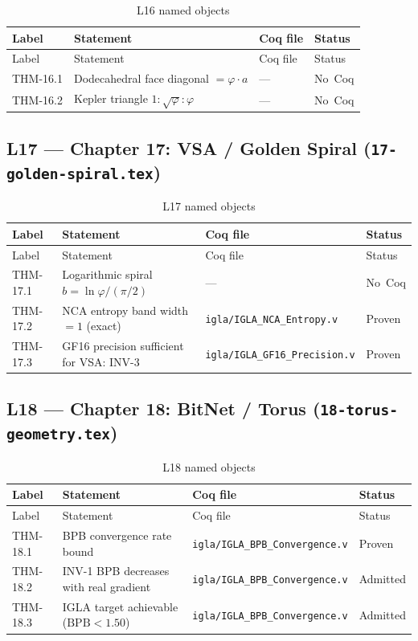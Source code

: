 \begin{longtable}{lp{6cm}ll}
\toprule
Label & Statement & Coq file & Status \\
\midrule
\endfirsthead
\toprule
Label & Statement & Coq file & Status \\
\midrule
\endhead
\bottomrule
\endfoot
\bottomrule
\caption{L16 named objects}
\endlastfoot
THM-16.1 & Dodecahedral face diagonal $= \varphi \cdot a$ & --- & No~Coq \\
THM-16.2 & Kepler triangle $1:\sqrt{\varphi}:\varphi$ & --- & No~Coq \\
\end{longtable}

\subsection{L17 — Chapter 17: VSA / Golden Spiral
  (\texttt{17-golden-spiral.tex})}
\label{sec:A-L17}

\begin{longtable}{lp{6cm}ll}
\toprule
Label & Statement & Coq file & Status \\
\midrule
\endfirsthead
\toprule
Label & Statement & Coq file & Status \\
\midrule
\endhead
\bottomrule
\endfoot
\bottomrule
\caption{L17 named objects}
\endlastfoot
THM-17.1 & Logarithmic spiral $b = \ln\varphi/(\pi/2)$ & --- & No~Coq \\
THM-17.2 & NCA entropy band width $= 1$ (exact) &
  \texttt{igla/IGLA\_NCA\_Entropy.v} & Proven \\
THM-17.3 & GF16 precision sufficient for VSA: INV-3 &
  \texttt{igla/IGLA\_GF16\_Precision.v} & Proven \\
\end{longtable}

\subsection{L18 — Chapter 18: BitNet / Torus
  (\texttt{18-torus-geometry.tex})}
\label{sec:A-L18}

\begin{longtable}{lp{6cm}ll}
\toprule
Label & Statement & Coq file & Status \\
\midrule
\endfirsthead
\toprule
Label & Statement & Coq file & Status \\
\midrule
\endhead
\bottomrule
\endfoot
\bottomrule
\caption{L18 named objects}
\endlastfoot
THM-18.1 & BPB convergence rate bound &
  \texttt{igla/IGLA\_BPB\_Convergence.v} & Proven \\
THM-18.2 & INV-1 BPB decreases with real gradient &
  \texttt{igla/IGLA\_BPB\_Convergence.v} & Admitted \\
THM-18.3 & IGLA target achievable ($\text{BPB}<1.50$) &
  \texttt{igla/IGLA\_BPB\_Convergence.v} & Admitted \\
\end{longtable}

